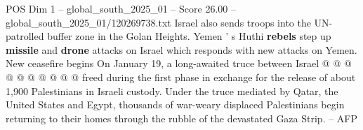 \begin{textsample}{POS Dim 1 – global\_south\_2025\_01 – Score 26.00 – global\_south\_2025\_01/120269738.txt}
Israel also sends troops into the UN-patrolled buffer zone in the Golan Heights.
Yemen ' s Huthi \textbf{rebels} step up \textbf{missile} and \textbf{drone} attacks on Israel which responds with new attacks on Yemen.
New ceasefire begins On January 19, a long-awaited truce between Israel @ @ @ @ @ @ @ @ @ @ freed during the first phase in exchange for the release of about 1,900 Palestinians in Israeli custody.
Under the truce mediated by Qatar, the United States and Egypt, thousands of war-weary displaced Palestinians begin returning to their homes through the rubble of the devastated Gaza Strip. -- AFP

\end{textsample}

